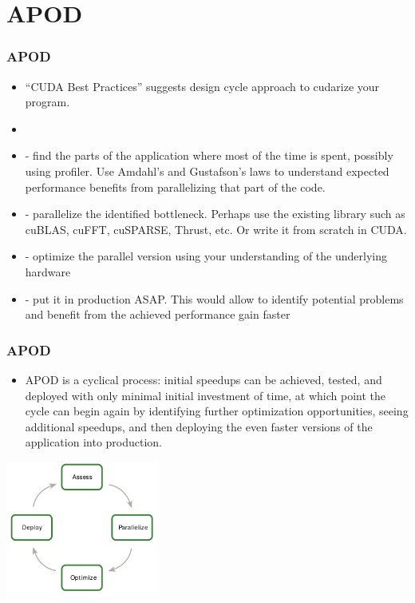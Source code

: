 \section{APOD}
\begin{frame}[fragile]
  \frametitle{APOD}
\begin{itemize}
\item ``CUDA Best Practices'' suggests  design cycle approach to cudarize your program.
\item {}
\item {} - find the parts of the application where most of the time is spent, possibly using profiler. Use Amdahl's and Gustafson's laws to understand expected performance benefits from parallelizing that part of the code.
\item {} - parallelize the identified bottleneck. Perhaps use the existing library such as 
  cuBLAS, cuFFT, cuSPARSE, Thrust, etc. Or write it from scratch in CUDA.
\item {} - optimize the parallel version using your understanding of the underlying hardware
\item {} - put it in production ASAP. This would allow to identify potential problems and benefit from the achieved performance gain faster
\end{itemize}
\end{frame}


\begin{frame}[fragile]
  \frametitle{APOD}
\begin{itemize}
\item APOD is a cyclical process: initial speedups can be achieved, tested, and deployed with
  only minimal initial investment of time, at which point the cycle can begin again by
  identifying further optimization opportunities, seeing additional speedups, and then
  deploying the even faster versions of the application into production.
\end{itemize}
\begin{center}
\includegraphics[width=5.0cm]{graphs/apod.png}
\end{center}
\end{frame}